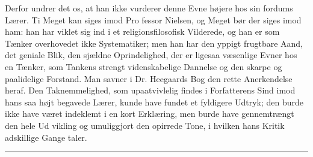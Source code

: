 \documentclass[12pt,a4paper,openany]{book}
\newcommand{\piecerule}{\par\begin{center}\rule{1.5cm}{0.4pt}\end{center}\par}
\newcommand{\opage}[1]{\marginnote{\footnotesize\textit{[#1]}}}
\begin{document}
Derfor undrer det os, at han ikke vurderer denne Evne
højere hos sin fordums Lærer. Ti Meget kan siges imod Pro\-%
fessor Nielsen, og Meget bør der siges imod ham: han har
viklet sig ind i et religionsfilosofisk Vilderede, og han er som
Tænker overhovedet ikke Systematiker; men han har den yppigt
frugtbare Aand, det geniale Blik, den sjældne Oprindelighed, der
er ligesaa væsenlige Evner hos en Tænker, som Tankens strengt
videnskabelige Dannelse og den skarpe og paalidelige Forstand.
\opage{109}Man savner i Dr. Heegaards Bog den rette Anerkendelse heraf.
Den Taknemmelighed, som upaatvivlelig findes i Forfatterens
Sind imod hans saa højt begavede Lærer, kunde have fundet
et fyldigere Udtryk; den burde ikke have været indeklemt i en
kort Erklæring, men burde have gennemtrængt den hele Ud\-%
vikling og umuliggjort den opirrede Tone, i hvilken hans Kritik
adskillige Gange taler.
\piecerule
\end{document}
